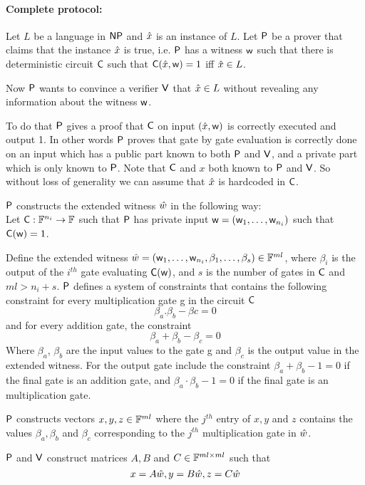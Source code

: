 \paragraph{\textbf{Complete protocol:}}\label{completeprotocol} Let $L$ be a language in $\mathsf{NP}$ and $\hat{x}$ is an instance of $L$. Let $\mathsf{P}$ be a prover that claims that the instance $\hat{x}$ is true, i.e. $\mathsf{P}$ has a witness $\mathsf{w}$ such that there is deterministic circuit $\mathsf{C}$ such that $\mathsf{C}(\hat{x},\mathsf{w})=1$ iff $\hat{x} \in L$. 

Now $\mathsf{P}$ wants to convince a verifier $\mathsf{V}$ that $\hat{x}\in L$ without revealing any information about the witness $\mathsf{w}$. 

To do that $\mathsf{P}$ gives a proof that $\mathsf{C}$ on input $(\hat{x}, \mathsf{w})$ is correctly executed and output 1. In other words $\mathsf{P}$ proves that gate by gate evaluation is correctly done on an input which has a public part known to both $\mathsf{P}$ and $\mathsf{V}$, and a private part which is only known to $\mathsf{P}$. 
Note that $\mathsf{C}$ and $x$ both known to $\mathsf{P}$ and $\mathsf{V}$. So without loss of generality we can assume that $\hat{x}$ is hardcoded in $\mathsf{C}$.

$\mathsf{P}$ constructs the extended witness $\hat{w}$ in the following way: \\
Let $\mathsf{C}:\mathbb{F}^{n_i}\rightarrow \mathbb{F}$ such that $\mathsf{P}$ has private input $\mathsf{w} = (\mathsf{w}_1,\ldots, \mathsf{w}_{n_i})$ such that $\mathsf{C}(\mathsf{w})=1$.

Define the extended witness $\hat{w} = (\mathsf{w}_1,\ldots,\mathsf{w}_{n_i}, \beta_1,\ldots, \beta_s) \in \mathbb{F}^{ml}$, where $\beta_i$ is the output of the $i^{th}$ gate evaluating $\mathsf{C}(\mathsf{w})$, and $s$ is the number of gates in $\mathsf{C}$ and $ml>n_i + s$. $\mathsf{P}$ defines a system of constraints that contains the following constraint for every multiplication gate g in the circuit $\mathsf{C}$ $$\beta_{a}.\beta_{b}-\beta{c}=0$$
and for every addition gate, the constraint 
$$\beta_a + \beta_b - \beta_c = 0$$
Where $\beta_a$, $\beta_b$ are the input values to the gate g and $\beta_c$ is the output value in the extended witness. For the output gate include the constraint $\beta_a + \beta_b - 1 = 0$ if the final gate is an addition gate, and $\beta_a\cdot \beta_b - 1 = 0$ if the final gate is an multiplication gate. 

$\mathsf{P}$ constructs vectors $x,y,z \in \mathbb{F}^{ml}$ where the $j^{th}$ entry of $x,y$ and $z$ contains the values $\beta_a, \beta_b$ and $\beta_c$ corresponding to the $j^{th}$ multiplication gate in $\hat{w}$.

$\mathsf{P}$ and $\mathsf{V}$ construct matrices $A, B$ and $C \in \mathbb{F}^{ml \times ml}$ such that 
$$x = A \hat{w}, y= B \hat{w}, z= C \hat{w}$$

